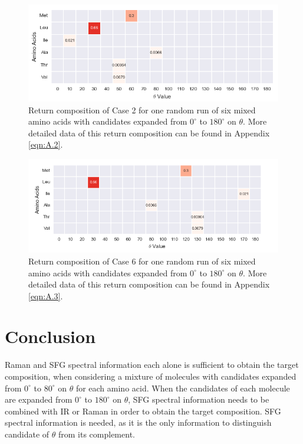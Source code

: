 \begin{figure}[!ht] 
\centering
\includegraphics[scale=0.7]{Figures/mixture_return_composition_of_E2_for_one_run_theta_0_180.png}
\caption{Return composition of Case 2 for one random run of six mixed amino acids with candidates expanded from $0^{\circ}$ to $180^{\circ}$ on $\theta$. More detailed data of this return composition can be found in Appendix \ref{eqn:A.2}.} 
\label{fig:5.5}
\end{figure}

\begin{figure}[!ht] 
\centering
\includegraphics[scale=0.7]{Figures/mixture_return_composition_of_E6_for_one_run_theta_0_180.png}
\caption{Return composition of Case 6 for one random run of six mixed amino acids with candidates expanded from $0^{\circ}$ to $180^{\circ}$ on $\theta$. More detailed data of this return composition can be found in Appendix \ref{eqn:A.3}.} 
\label{fig:5.6}
\end{figure}

\section{Conclusion}
Raman and SFG spectral information each alone is sufficient to obtain the target composition, when considering a mixture of molecules with candidates expanded from $0^{\circ}$ to $80^{\circ}$ on $\theta$ for each amino acid. When the candidates of each molecule are expanded from $0^{\circ}$ to $180^{\circ}$ on $\theta$, SFG spectral information needs to be combined with IR or Raman in order to obtain the target composition. SFG spectral information is needed, as it is the only information to distinguish candidate of $\theta$ from its complement.\\
